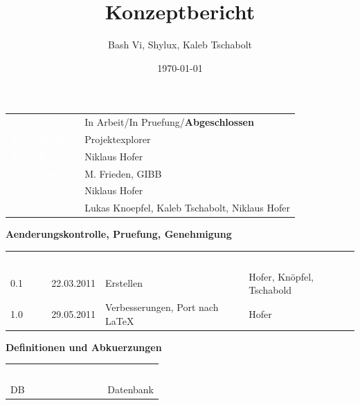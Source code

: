 \documentclass[10pt,paper=a4,final]{scrartcl}
\title{Konzeptbericht}
\author{Bash Vi, Shylux, Kaleb Tschabolt}
\date{\today}
\begin{document}
\maketitle
\newpage
\begin{tabularx}{\textwidth}{ r X }	%
  \textcolor{white}{{\bf Status}}\cellcolor{blue!80!} & In Arbeit/In Pruefung/{\bf Abgeschlossen}\cellcolor{blue!20!} \\
\textcolor{white}{{\bf Projektname}}\cellcolor{blue!80!} & Projektexplorer\cellcolor{blue!20!} \\
\textcolor{white}{{\bf Projektleiter}}\cellcolor{blue!80!} & Niklaus Hofer\cellcolor{blue!20!} \\
\textcolor{white}{{\bf Auftraggeber}}\cellcolor{blue!80!} & M. Frieden, GIBB\cellcolor{blue!20!} \\
\textcolor{white}{{\bf Autoren}}\cellcolor{blue!80!} & Niklaus Hofer\cellcolor{blue!20!} \\
\textcolor{white}{{\bf Verteiler}}\cellcolor{blue!80!} & Lukas Knoepfel, Kaleb Tschabolt, Niklaus Hofer\cellcolor{blue!20!}
\end{tabularx}
\newline
\newline
\newline
{\bf Aenderungskontrolle, Pruefung, Genehmigung}
\newline

\begin{tabularx}{\textwidth}{l l X X}
\textcolor{white}{Version}\cellcolor{blue!80!} & \textcolor{white}{Datum}\cellcolor{blue!80!} & \textcolor{white}{Beschreibung, Bemerkung}\cellcolor{blue!80!} & \textcolor{white}{Name oder Rolle}\cellcolor{blue!80!} \\
\cellcolor{blue!20!} 0.1 & 22.03.2011 \cellcolor{blue!20!} & Erstellen \cellcolor{blue!20!} & Hofer, Kn\"opfel, Tschabold\cellcolor{blue!20!} \\
\cellcolor{blue!20!} 1.0 & 29.05.2011 \cellcolor{blue!20!} & Verbesserungen, Port nach \LaTeX \cellcolor{blue!20!} & Hofer \cellcolor{blue!20!} \\
\end{tabularx}
\newline
\newline
\newline
{\bf Definitionen und Abkuerzungen}
\newline

\begin{tabularx}{\textwidth}{l X}
\textcolor{white}{Begriff/ Abkuerzung}\cellcolor{blue!80!} & \textcolor{white}{Bedeutung}\cellcolor{blue!80!} \\
\cellcolor{blue!20!} DB & Datenbank \cellcolor{blue!20!} \\
\end{tabularx} 
\newline
\newline
\newline

{}
\flushleft
\newpage
\tableofcontents
\newpage
\end{document}
